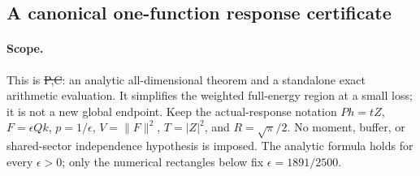\subsection{A canonical one-function response certificate}
\label{sec:one-erfc-response}
\paragraph{Scope.}
This is \st{P,C}: an analytic all-dimensional theorem and a standalone
exact arithmetic evaluation. It simplifies the weighted full-energy
region at a small loss; it is not a new global endpoint.
Keep the actual-response notation $Ph=tZ$, $F=\epsilon Qk$,
$p=1/\epsilon$, $V=\|F\|^2$, $T=|Z|^2$, and $R=\sqrt\pi/2$.
No moment, buffer, or shared-sector independence hypothesis is imposed.
The analytic formula holds for every $\epsilon>0$; only the numerical
rectangles below fix $\epsilon=1891/2500$.

